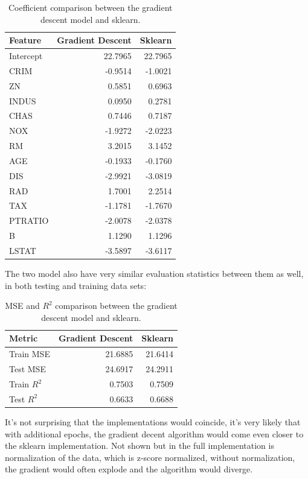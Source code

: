 \documentclass{article} %
\begin{document}
\begin{table}[h]
  \centering
  \begin{tabular}{lrr}
    \hline
    Feature & Gradient Descent & Sklearn \\
    \hline
    Intercept & 22.7965 & 22.7965 \\
    CRIM & -0.9514 & -1.0021 \\
    ZN & 0.5851 & 0.6963 \\
    INDUS & 0.0950 & 0.2781 \\
    CHAS & 0.7446 & 0.7187 \\
    NOX & -1.9272 & -2.0223 \\
    RM & 3.2015 & 3.1452 \\
    AGE & -0.1933 & -0.1760 \\
    DIS & -2.9921 & -3.0819 \\
    RAD & 1.7001 & 2.2514 \\
    TAX & -1.1781 & -1.7670 \\
    PTRATIO & -2.0078 & -2.0378 \\
    B & 1.1290 & 1.1296 \\
    LSTAT & -3.5897 & -3.6117 \\
    \hline
  \end{tabular}
  \caption{Coefficient comparison between the gradient descent model
  and sklearn.}
\end{table}
\pagebreak
The two model also have very similar evaluation statistics between
them as well, in both testing and training data sets:
\begin{table}[h]
  \centering
  \begin{tabular}{lrr}
    \hline
    Metric & Gradient Descent & Sklearn \\
    \hline
    Train MSE & 21.6885 & 21.6414 \\
    Test MSE & 24.6917 & 24.2911 \\
    Train $R^2$ & 0.7503 & 0.7509 \\
    Test $R^2$ & 0.6633 & 0.6688 \\
    \hline
  \end{tabular}
  \caption{MSE and $R^2$ comparison between the gradient descent model
  and sklearn.}
\end{table}

It's not surprising that the implementations would coincide, it's
very likely that with additional epochs, the gradient decent
algorithm would come even closer to the sklearn implementation. Not
shown but in the full implementation is normalization of the data,
which is z-score normalized, without normalization, the gradient
would often explode and the algorithm would diverge.
\end{document}
